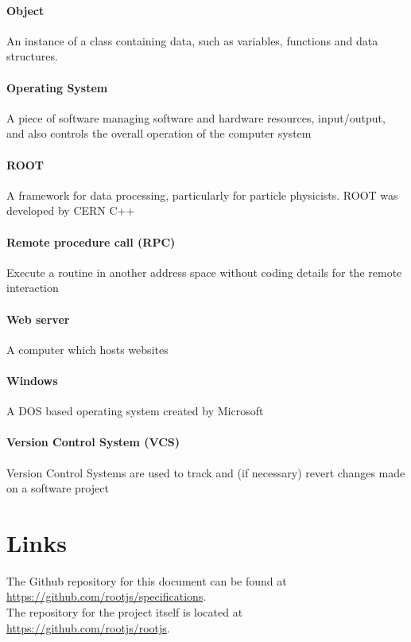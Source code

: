 \paragraph{Object}
An instance of a class containing data, such as variables, functions and data structures.

\paragraph{Operating System}
A piece of software managing software and hardware resources, input/output, and also controls the overall operation of the computer system

\paragraph{ROOT}
A framework for data processing, particularly for particle physicists. ROOT was developed by CERN C++


\paragraph{Remote procedure call (RPC)}
Execute a routine in another address space without coding details for the remote interaction

\paragraph{Web server}
A computer which hosts websites

\paragraph{Windows}
A DOS based operating system created by Microsoft

\paragraph{Version Control System (VCS)}
Version Control Systems are used to track and (if necessary) revert changes made on a software project

\pagebreak[4]

\section{Links}

The Github repository for this document can be found at \url{https://github.com/rootjs/specifications}. \\
The repository for the project itself is located at \url{https://github.com/rootjs/rootjs}.
